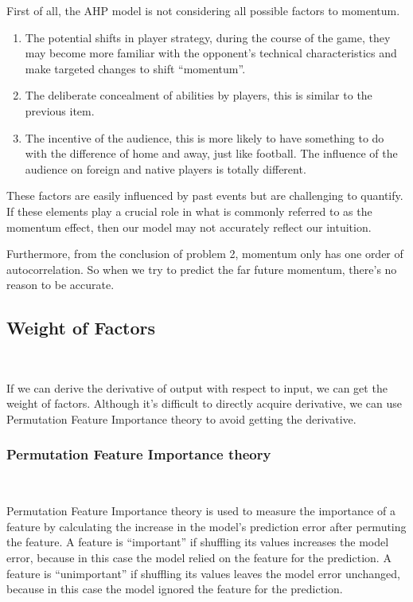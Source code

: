 First of all, the AHP model is not considering all possible factors to momentum.

\begin{enumerate}
    \item The potential shifts in player strategy, during the course of the game, they may become more 
    familiar with the opponent's technical characteristics and make targeted changes to shift ``momentum''.
    \item The deliberate concealment of abilities by players, this is similar to the previous item.
    \item The incentive of the audience, this is more likely to have something to do with the difference of home and away,
    just like football. The influence of the audience on foreign and native players is totally different.
\end{enumerate}

These factors are easily influenced by past events but are challenging to quantify.
If these elements play a crucial role in what is commonly referred to as the momentum effect,
then our model may not accurately reflect our intuition.

Furthermore, from the conclusion of problem 2, momentum only has one order of autocorrelation.
So when we try to predict the far future momentum, there's no reason to be accurate.

\subsection{Weight of Factors}~{}

If we can derive the derivative of output with respect to input, we can get the weight of factors.
Although it's difficult to directly acquire derivative, we can use Permutation Feature Importance theory\cite{Permutation}
to avoid getting the derivative.

\subsubsection{Permutation Feature Importance theory}~{}

Permutation Feature Importance theory\cite{Weight} is used to measure the importance of a feature by calculating 
the increase in the model's prediction error after permuting the feature. A feature is “important” if shuffling its values increases the model error, 
because in this case the model relied on the feature for the prediction. A feature is “unimportant” if 
shuffling its values leaves the model error unchanged, because in this case the model ignored the feature 
for the prediction. 

